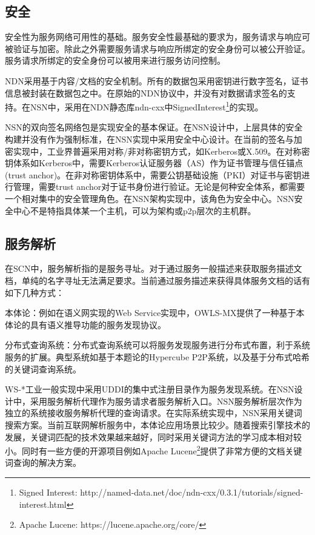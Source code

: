 \subsection{安全}
安全性为服务网络可用性的基础。服务安全性最基础的要求为，服务请求与响应可被验证与加密。除此之外需要服务请求与响应所绑定的安全身份可以被公开验证。服务请求所绑定的安全身份可以被用来进行服务访问控制。

NDN采用基于内容/文档的安全机制。所有的数据包采用密钥进行数字签名，证书信息被封装在数据包之中。在原始的NDN协议中，并没有对数据请求签名的支持。在NSN中，采用在NDN静态库ndn-cxx中SignedInterest\footnote{Signed Interest: http://named-data.net/doc/ndn-cxx/0.3.1/tutorials/signed-interest.html}的实现。

NSN的双向签名网络包是实现安全的基本保证。在NSN设计中，上层具体的安全构建并没有作为强制标准，在NSN实现中采用安全中心设计。在当前的签名与加密实现中，工业界普遍采用对称/非对称密钥方式，如Kerberos或X.509。在对称密钥体系如Kerberos中，需要Kerberos认证服务器（AS）作为证书管理与信任锚点(trust anchor)。在非对称密钥体系中，需要公钥基础设施（PKI）对证书与密钥进行管理，需要trust anchor对于证书身份进行验证。无论是何种安全体系，都需要一个相对集中的安全管理角色。在NSN架构实现中，该角色为安全中心。NSN安全中心不是特指具体某一个主机，可以为架构或p2p层次的主机群。

\subsection{服务解析}
在SCN中，服务解析指的是服务寻址。对于通过服务一般描述来获取服务描述文档，单纯的名字寻址无法满足要求。当前通过服务描述来获得具体服务文档的话有如下几种方式：

本体论：例如在语义网实现的Web Service实现中，OWLS-MX提供了一种基于本体论的具有语义推导功能的服务发现协议。\cite{klusch2006automated}

分布式查询系统：分布式查询系统可以将服务发现服务进行分布式布置，利于系统服务的扩展。典型系统如基于本题论的Hypercube P2P系统\cite{schlosser2002scalable}，以及基于分布式哈希的关键词查询系统\cite{schmidt2004peer}。

WS-*工业一般实现中采用UDDI的集中式注册目录作为服务发现系统。在NSN设计中，采用服务解析代理作为服务请求者服务解析入口。NSN服务解析层次作为独立的系统接收服务解析代理的查询请求。在实际系统实现中，NSN采用关键词搜索方案。当前互联网解析服务中，本体论应用场景比较少。随着搜索引擎技术的发展，关键词匹配的技术效果越来越好，同时采用关键词方法的学习成本相对较小。同时有一些方便的开源项目例如Apache Lucene\footnote{Apache Lucene: https://lucene.apache.org/core/}提供了非常方便的文档关键词查询的解决方案。


